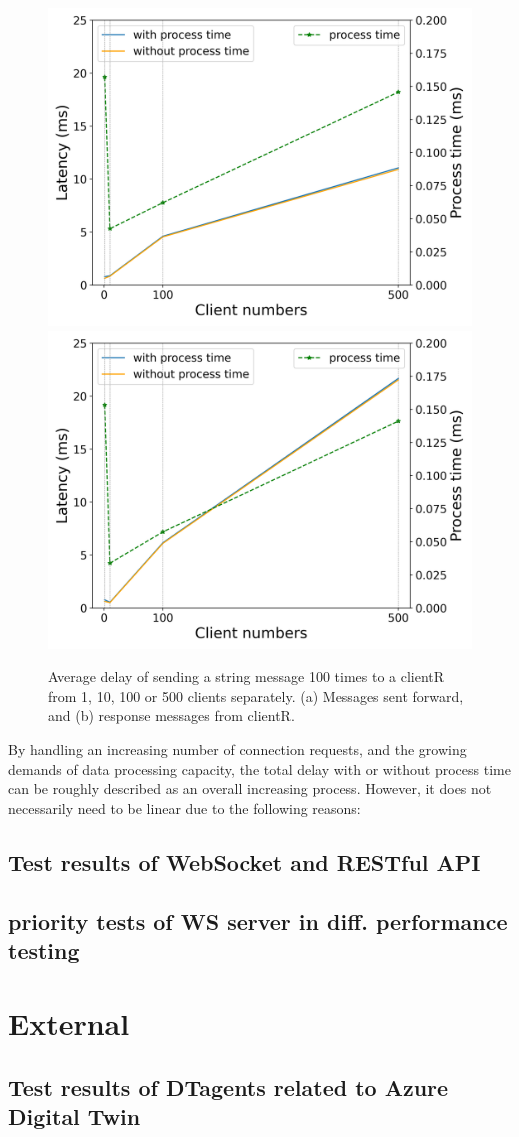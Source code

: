 \begin{figure}[htb]
    \centering
    \includegraphics[width=.49\textwidth]{figures/tests_yong/Average_string_messages_sending_time_of_100_tests_of_diff_client_numbers.png}\hfill 
    \includegraphics[width=.49\textwidth]{figures/tests_yong/Average_string_messages_receiving_time_of_100_tests_of_diff_client_numbers.png}\hfill 
    \caption{Average delay of sending a string message 100 times 
    to a clientR from 1, 10, 100 or 500 clients separately. (a) Messages sent forward, 
    and (b) response messages from clientR. 
    \label{fig: proportional-clients}}
\end{figure}

By handling an increasing number of connection requests, and the growing demands 
of data processing capacity, the total delay with or without process time can be 
roughly described as an overall increasing process. However, it does not necessarily 
need to be linear due to the following reasons:  


\subsection{Test results of WebSocket and RESTful API} \label{chap: Result-RestFUL_WS}

\subsection{priority tests of WS server in diff. performance testing} \label{chap: Result-priority}

\section{External}\label{chap: Result-External}

\subsection{Test results of DTagents related to Azure Digital Twin} \label{chap: Result-DT}